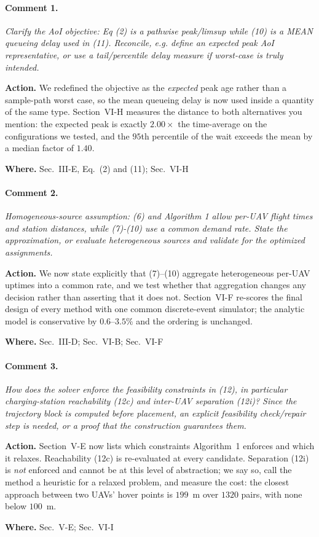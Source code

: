 \documentclass[10pt]{article}
\newcommand{\rev}[1]{\par\medskip\noindent\textit{#1}\par\smallskip}
\newcommand{\act}[2]{\noindent\textbf{Action.} #1\par\noindent\textbf{Where.} #2\par}
\begin{document}
\paragraph{Comment 1.}
\rev{Clarify the AoI objective: Eq (2) is a pathwise peak/limsup while (10) is a MEAN queueing delay used in (11). Reconcile, e.g. define an expected peak AoI representative, or use a tail/percentile delay measure if worst-case is truly intended.}
\act{We redefined the objective as the \emph{expected} peak age rather than a sample-path worst case, so the mean queueing delay is now used inside a quantity of the same type. Section~VI-H measures the distance to both alternatives you mention: the expected peak is exactly $2.00\times$ the time-average on the configurations we tested, and the $95$th percentile of the wait exceeds the mean by a median factor of $1.40$.}{Sec.~III-E, Eq.~(2) and (11); Sec.~VI-H}

\paragraph{Comment 2.}
\rev{Homogeneous-source assumption: (6) and Algorithm 1 allow per-UAV flight times and station distances, while (7)-(10) use a common demand rate. State the approximation, or evaluate heterogeneous sources and validate for the optimized assignments.}
\act{We now state explicitly that (7)--(10) aggregate heterogeneous per-UAV uptimes into a common rate, and we test whether that aggregation changes any decision rather than asserting that it does not. Section~VI-F re-scores the final design of every method with one common discrete-event simulator; the analytic model is conservative by $0.6$--$3.5\%$ and the ordering is unchanged.}{Sec.~III-D; Sec.~VI-B; Sec.~VI-F}

\paragraph{Comment 3.}
\rev{How does the solver enforce the feasibility constraints in (12), in particular charging-station reachability (12c) and inter-UAV separation (12i)? Since the trajectory block is computed before placement, an explicit feasibility check/repair step is needed, or a proof that the construction guarantees them.}
\act{Section~V-E now lists which constraints Algorithm~1 enforces and which it relaxes. Reachability (12c) is re-evaluated at every candidate. Separation (12i) is \emph{not} enforced and cannot be at this level of abstraction; we say so, call the method a heuristic for a relaxed problem, and measure the cost: the closest approach between two UAVs' hover points is $199$~m over $1320$ pairs, with none below $100$~m.}{Sec.~V-E; Sec.~VI-I}
\end{document}
